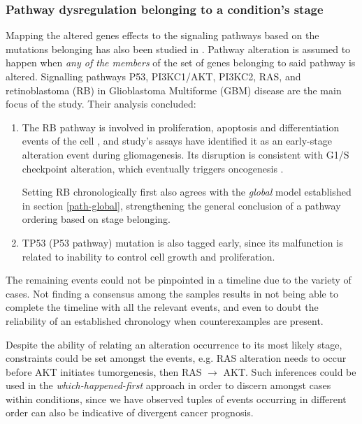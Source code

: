 \subsubsection{Pathway dysregulation belonging to a condition's stage}
Mapping the altered genes effects to the signaling pathways based on the mutations belonging has also been studied in \cite{Cheng2012AGliomagenesis}. Pathway alteration is assumed to happen when \textit{any of the members} of the set of genes belonging to said pathway is altered. Signalling pathways P53, PI3KC1/AKT, PI3KC2, RAS, and retinoblastoma (RB) in Glioblastoma Multiforme (GBM) disease are the main focus of the study. Their analysis concluded:

\begin{enumerate}
    \item The RB pathway is involved in proliferation, apoptosis and differentiation events of the cell \cite{Du2012TheTherapeutics}, and study's assays have identified it as an early-stage alteration event during gliomagenesis. Its disruption is consistent with G1/S checkpoint alteration, which eventually triggers oncogenesis \cite{Bertoli2013ControlPhases}.
    
    Setting RB chronologically first also agrees with the \textit{global} model established in section \ref{path-global}, strengthening the general conclusion of a pathway ordering based on stage belonging.
    
    \item TP53 (P53 pathway) mutation is also tagged early, since its malfunction is related to inability to control cell growth and proliferation.
\end{enumerate}

The remaining events could not be pinpointed in a timeline due to the variety of cases. Not finding a consensus among the samples results in not being able to complete the timeline with all the relevant events, and even to doubt the reliability of an established chronology when counterexamples are present.

Despite the ability of relating an alteration occurrence to its most likely stage, constraints could be set amongst the events, e.g. RAS alteration needs to occur before AKT initiates tumorgenesis, then RAS $\rightarrow$ AKT. Such inferences could be used in the \textit{which-happened-first} approach in order to discern amongst cases within conditions, since we have observed tuples of events occurring in different order can also be indicative of divergent cancer prognosis.

